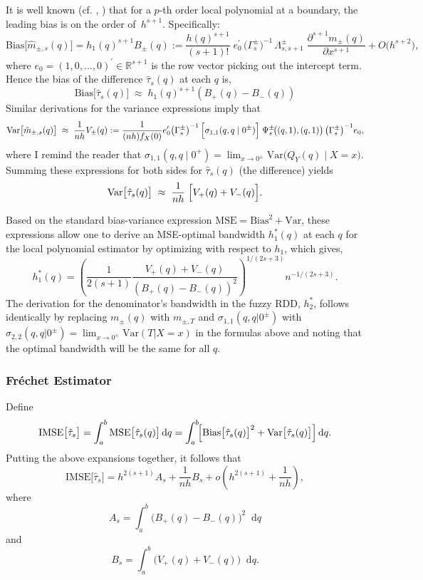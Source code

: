 \documentclass[12pt]{article}
\newcommand*\dd{\mathop{}\!\mathrm{d}}
\begin{document}
It is well known (cf. \citet{fan1992variable}, \citet{calonico2014robust}) that for a 
$p$‐th order local polynomial at a boundary, the leading bias is on the order of 
$\,h^{s+1}$.  Specifically:
\[
\mathrm{Bias}\bigl[\hat{m}_{\pm,s}(q)\bigr]
  =  h_1(q)^{s+1} B_\pm(q) := 
  \frac{h(q)^{s+1}}{(s+1)!}\;
  e_{0}^{\prime}\,
\bigl(\Gamma_{s}^{\pm}\bigr)^{-1}\,\Lambda_{s,s+1}^{\pm}
  \;\frac{\partial^{s+1} m_{\pm}(q)}{\partial x^{s+1}}
  + O\bigl(h^{s+2}\bigr),
\]
where $e_{0}=(1,0,\dots,0)^\prime\in\mathbb{R}^{s+1}$ is the row vector picking out the 
intercept term.  
Hence the bias of the difference \(\hat{\tau}_{s}(q)\) at each $q$ is, 
\[
  \mathrm{Bias}\bigl[\hat{\tau}_{s}(q)\bigr]
  \;\approx\;
  h_1(q)^{s+1} \left( B_+(q)  - B_-(q) \right)
\]
Similar derivations for the variance expressions imply that
\[
  \mathrm{Var}\bigl[\hat{m}_{\pm,s}(q)\bigr]
  \;\approx\;
  \frac{1}{n h} V_\pm(q) := 
\frac{1}{(n h) f_X(0)}  e_0^{\prime}\bigl(\Gamma_{s}^{\pm}\bigr)^{-1}\,
  \Bigl[\sigma_{1,1}(q,q\mid 0^\pm)\Bigr]\;
  \Psi_{s}^{\pm}\!\bigl((q,1),(q,1)\bigr)\,
\bigl(\Gamma_{s}^{\pm}\bigr)^{-1} e_0,
\]
where I remind the reader that $\sigma_{1,1}(q,q\mid 0^+)= \lim_{x \to 0^\pm }\mathrm{Var}\bigl(Q_{Y}(q)\mid X=x\bigr)$. Summing these expressions for both sides for $\hat{\tau}_{s}(q)$ 
(the difference) yields
\[
  \mathrm{Var}\bigl[\hat{\tau}_{s}(q)\bigr]
  \;\approx\;
  \frac{1}{nh}\;\Bigl[
    V_{+}(q) + V_{-}(q)
  \Bigr].
\]

 Based on the standard bias-variance expression $\mathrm{MSE} = \mathrm{Bias}^2 + \mathrm{Var}$, these expressions allow one to derive an MSE-optimal bandwidth $h_1^*(q)$ at each $q$ for the local polynomial estimator by optimizing with respect to $h_1$, which gives,
 \begin{equation} \label{eq:h_mse}
 h^*_1(q) = \left( \frac{1}{2(s+1)} \frac{V_+(q) + V_-(q)}{ (B_+(q) - B_-(q))^2} \right)^{1/(2s+3)} n^{-1/(2s+3)}.
 \end{equation}
The derivation for the denominator's bandwidth in the fuzzy RDD, $h_2^*$, follows identically by replacing $m_{\pm}(q)$ with $m_{\pm,T}$ and $\sigma_{1,1}(q,q | 0^\pm)$ with $\sigma_{2,2}(q,q | 0^\pm) = \lim_{x \to 0^\pm}\mathrm{Var}(T | X=x)$ in the formulas above and noting that the optimal bandwidth will be the same for all $q$. 


\subsubsection{Fr\'echet Estimator}
Define
\[  \mathrm{IMSE}\bigl[\hat{\tau}_{s}\bigr]
  =
  \int_{a}^{b}
    \mathrm{MSE}\bigl[\hat{\tau}_{s}(q)\bigr]
  \dd q
  =
  \int_{a}^{b}\!\Bigl[
    \mathrm{Bias}\bigl[\hat{\tau}_{s}(q)\bigr]^{2}
    +\mathrm{Var}\bigl[\hat{\tau}_{s}(q)\bigr]
  \Bigr]\dd q.
\]
Putting the above expansions together, it follows that
\[
  \mathrm{IMSE}\bigl[\hat{\tau}_{s}\bigr]
  =
  h^{2(s+1)} A_{s}
  +
  \frac{1}{nh}B_{s}
  +
  o\!\left(h^{2(s+1)} + \frac1{nh}\right),
\]
where
\[
  A_{s}
  = \int_a^b \!\bigl(B_+(q)  - B_-(q)\bigr)^2 \dd q
\]
and
\[
  B_{s}
  = \int_{a}^{b} \!\bigl(V_+(q) + V_-(q)\bigr) \dd q.
\]
\end{document}

